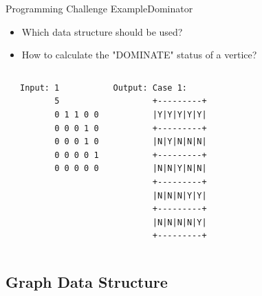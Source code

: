 \begin{frame}[fragile]{Programming Challenge Example}{Dominator}
  \begin{block}{}
    \begin{itemize}
      \item Which data structure should be used?
      \item How to calculate the "DOMINATE" status of a vertice?
    \end{itemize}
  \end{block}
  \begin{columns}[T]
      \begin{center}
        
      \end{center}
\begin{verbatim}
Input: 1
       5
       0 1 1 0 0
       0 0 0 1 0
       0 0 0 1 0
       0 0 0 0 1
       0 0 0 0 0
\end{verbatim}
{\smaller
\begin{verbatim}
Output: Case 1:
        +---------+
        |Y|Y|Y|Y|Y|
        +---------+
        |N|Y|N|N|N|
        +---------+
        |N|N|Y|N|N|
        +---------+
        |N|N|N|Y|Y|
        +---------+
        |N|N|N|N|Y|
        +---------+
\end{verbatim}}
    \end{columns}
\end{frame}

\subsection{Graph Data Structure}


